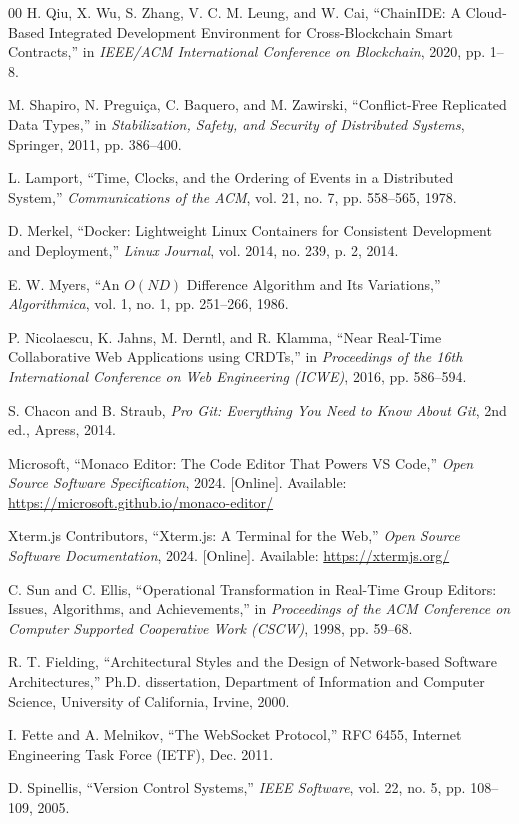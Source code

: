 \documentclass[conference]{IEEEtran}
\begin{document}
\begin{thebibliography}{00}
H. Qiu, X. Wu, S. Zhang, V. C. M. Leung, and W. Cai, ``ChainIDE: A Cloud-Based Integrated Development Environment for Cross-Blockchain Smart Contracts,'' in \textit{IEEE/ACM International Conference on Blockchain}, 2020, pp. 1--8.

M. Shapiro, N. Pregui{\c{c}}a, C. Baquero, and M. Zawirski, ``Conflict-Free Replicated Data Types,'' in \textit{Stabilization, Safety, and Security of Distributed Systems}, Springer, 2011, pp. 386--400.

L. Lamport, ``Time, Clocks, and the Ordering of Events in a Distributed System,'' \textit{Communications of the ACM}, vol. 21, no. 7, pp. 558--565, 1978.

D. Merkel, ``Docker: Lightweight Linux Containers for Consistent Development and Deployment,'' \textit{Linux Journal}, vol. 2014, no. 239, p. 2, 2014.

E. W. Myers, ``An $O(ND)$ Difference Algorithm and Its Variations,'' \textit{Algorithmica}, vol. 1, no. 1, pp. 251--266, 1986.

P. Nicolaescu, K. Jahns, M. Derntl, and R. Klamma, ``Near Real-Time Collaborative Web Applications using CRDTs,'' in \textit{Proceedings of the 16th International Conference on Web Engineering (ICWE)}, 2016, pp. 586--594.

S. Chacon and B. Straub, \textit{Pro Git: Everything You Need to Know About Git}, 2nd ed., Apress, 2014.

Microsoft, ``Monaco Editor: The Code Editor That Powers VS Code,'' \textit{Open Source Software Specification}, 2024. [Online]. Available: \url{https://microsoft.github.io/monaco-editor/}

Xterm.js Contributors, ``Xterm.js: A Terminal for the Web,'' \textit{Open Source Software Documentation}, 2024. [Online]. Available: \url{https://xtermjs.org/}

C. Sun and C. Ellis, ``Operational Transformation in Real-Time Group Editors: Issues, Algorithms, and Achievements,'' in \textit{Proceedings of the ACM Conference on Computer Supported Cooperative Work (CSCW)}, 1998, pp. 59--68.

R. T. Fielding, ``Architectural Styles and the Design of Network-based Software Architectures,'' Ph.D. dissertation, Department of Information and Computer Science, University of California, Irvine, 2000.

I. Fette and A. Melnikov, ``The WebSocket Protocol,'' RFC 6455, Internet Engineering Task Force (IETF), Dec. 2011.

D. Spinellis, ``Version Control Systems,'' \textit{IEEE Software}, vol. 22, no. 5, pp. 108--109, 2005.

\end{thebibliography}
\end{document}
